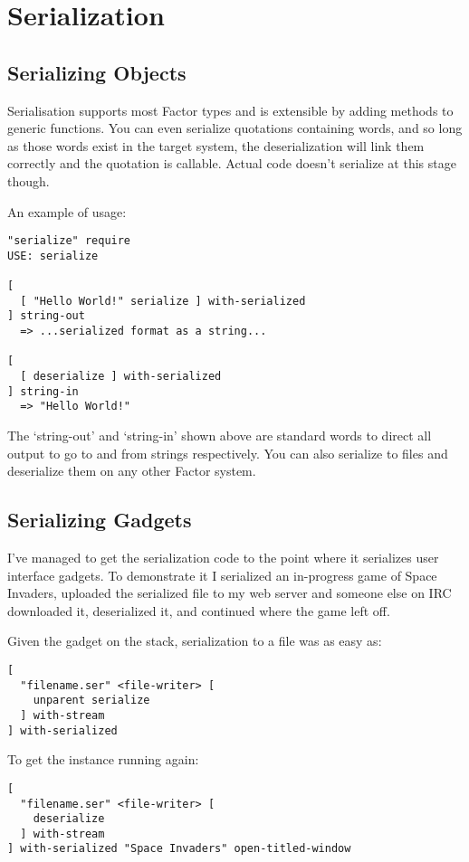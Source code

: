 \chapter{Serialization}\label{serialization}

\section{Serializing Objects}

Serialisation supports most Factor types and is extensible by adding methods to generic functions. You can even serialize quotations containing words, and so long as those words exist in the target system, the deserialization will link them correctly and the quotation is callable. Actual code doesn't serialize at this stage though.

An example of usage:

\begin{verbatim}
"serialize" require
USE: serialize

[
  [ "Hello World!" serialize ] with-serialized
] string-out
  => ...serialized format as a string...

[
  [ deserialize ] with-serialized
] string-in 
  => "Hello World!"
\end{verbatim}

The `string-out' and `string-in' shown above are standard words to direct all output to go to and from strings respectively. You can also serialize to files and deserialize them on any other Factor system.

\section{Serializing Gadgets}
I've managed to get the serialization code to the point where it serializes user interface gadgets. To demonstrate it I serialized an in-progress game of Space Invaders, uploaded the serialized file to my web server and someone else on IRC downloaded it, deserialized it, and continued where the game left off.

Given the gadget on the stack, serialization to a file was as easy as:

\begin{verbatim}
[ 
  "filename.ser" <file-writer> [ 
    unparent serialize 
  ] with-stream 
] with-serialized
\end{verbatim}

To get the instance running again:

\begin{verbatim}
[ 
  "filename.ser" <file-writer> [ 
    deserialize 
  ] with-stream 
] with-serialized "Space Invaders" open-titled-window
\end{verbatim}
